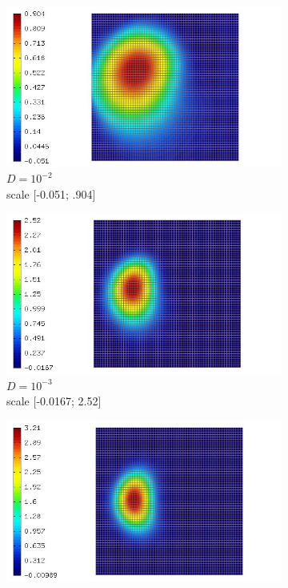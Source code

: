 \documentclass[mathserif]{beamer}
\begin{document}
\begin{frame}
\begin{figure}[H]
\begin{subfigure}[H]{0.02\textwidth}
	\end{subfigure}
	\begin{subfigure}[H]{0.3\textwidth}
		\centering
		\includegraphics[width=.9\textwidth, trim = 65mm 0mm 0mm 0mm, clip]{images/timedep-multiscale/convergence/4096_eps=001_201.jpg}
		\vspace{-3mm}
		\caption{$D = 10^{-2}$\\\vspace{-2mm}scale [-0.051; .904]}
	\end{subfigure}
	\begin{subfigure}[H]{0.3\textwidth}
		\centering
		\includegraphics[width=.9\textwidth, trim = 65mm 0mm 0mm 0mm, clip]{images/timedep-multiscale/convergence/4096_eps=0001_201.jpg}
		\vspace{-3mm}
		\caption{$D = 10^{-3}$\\\vspace{-2mm}scale [-0.0167; 2.52]}
	\end{subfigure}
	\begin{subfigure}[H]{0.3\textwidth}
		\centering
		\includegraphics[width=.9\textwidth, trim = 65mm 0mm 0mm 0mm, clip]{images/timedep-multiscale/convergence/4096_eps=0_201.jpg}

\end{subfigure}
\end{figure}
\end{frame}
\end{document}
